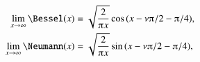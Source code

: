     \begin{subequations}\label{eq:cylinder:prop:JacobiAnger}
        \begin{align}
            \lim_{x\to \infty} \Bessel(x) &=
            \sqrt{\frac{2}{\ppi x}} \cos{(x - \nu \ppi/2 - \ppi/4)}, \label{eq:cylinder:prop:JacobiAnger_sin}  \\
            \lim_{x\to \infty} \Neumann(x) &=
            \sqrt{\frac{2}{\ppi x}} \sin{(x - \nu \ppi/2 - \ppi/4)},\label{eq:cylinder:prop:JacobiAnger_cos} 
        \end{align}
    \end{subequations}


